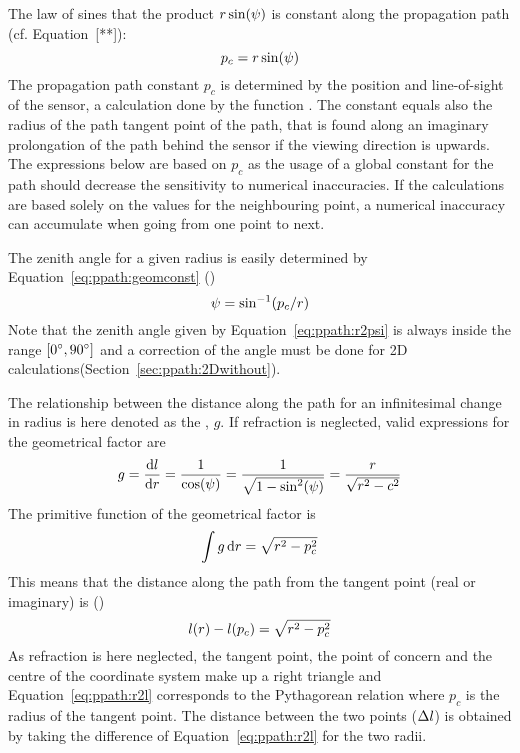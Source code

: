 The law of sines that the product $r\sin(\psi)$ is constant
along the propagation path (cf. Equation~[**]):
\begin{equation}
  p_c = r\sin(\psi)
  \label{eq:ppath:geomconst}
\end{equation}
The propagation path constant $p_c$ is determined by the position and
line-of-sight of the sensor, a calculation done by the function
. The constant equals also the radius of the path
tangent point of the path, that is found along an imaginary
prolongation of the path behind the sensor if the viewing direction is
upwards. The expressions below are based on $p_c$ as the usage of a
global constant for the path should decrease the sensitivity to
numerical inaccuracies. If the calculations are based solely on the
values for the neighbouring point, a numerical inaccuracy can
accumulate when going from one point to next.

The zenith angle for a given radius is easily determined by
Equation~\ref{eq:ppath:geomconst} ()
\begin{equation}
  \psi = \sin^{-1}(p_c/r)
  \label{eq:ppath:r2psi}
\end{equation}
Note that the zenith angle given by Equation~\ref{eq:ppath:r2psi} is
always inside the range $[0^\circ,90^\circ]$ and a correction of the
angle must be done for 2D calculations(Section~\ref{sec:ppath:2Dwithout}).

The relationship between the distance along the path for an
infinitesimal change in radius is here denoted as the
, $g$. If refraction is neglected, valid
expressions for the geometrical factor are
\begin{equation}
  g = \frac{\mathrm{d} l}{\mathrm{d} r} 
           = \frac{1}{\cos(\psi)} = \frac{1}{\sqrt{1-\sin^2(\psi)}}
                                            = \frac{r}{\sqrt{r^2-c^2}}
  \label{eq:ppath:geomfac}
\end{equation}
The primitive function of the geometrical factor is 
\begin{equation}
  \int{g}\,\mathrm{d} r = \sqrt{r^2-p_c^2} 
\end{equation}
This means that the distance along the path from the tangent point
(real or imaginary) is ()
\begin{equation}
  l(r) - l(p_c) = \sqrt{r^2-p_c^2} 
  \label{eq:ppath:r2l}
\end{equation}
As refraction is here neglected, the tangent
point, the point of concern and the centre of the coordinate system
make up a right triangle and Equation~\ref{eq:ppath:r2l}
corresponds to the Pythagorean relation where $p_c$ is the radius of
the tangent point. The distance between the two points ($\Delta
l$) is obtained by taking the difference of
Equation~\ref{eq:ppath:r2l} for the two radii. 

